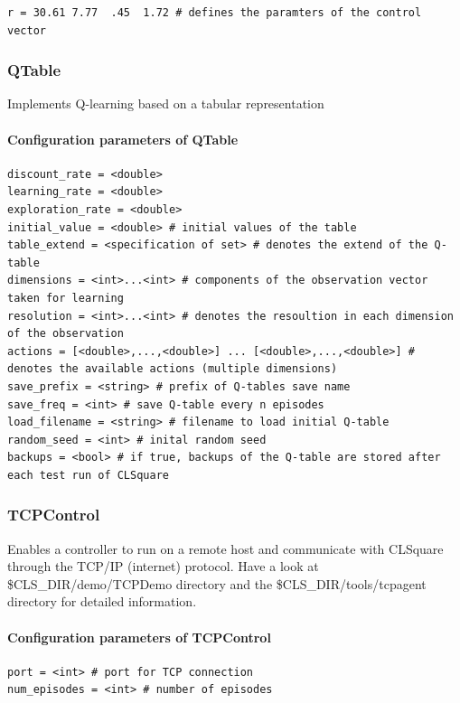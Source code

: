 \documentclass[a4paper,12pt,german]{article}
\newcommand{\clsdir}{{\$CLS\_DIR}}
\begin{document}
\begin{verbatim}
r = 30.61 7.77  .45  1.72 # defines the paramters of the control vector
\end{verbatim}

\subsubsection{QTable}

Implements Q-learning based on a tabular representation

\paragraph{Configuration parameters of QTable}

\begin{footnotesize}
\begin{verbatim}
discount_rate = <double>
learning_rate = <double>  
exploration_rate = <double> 
initial_value = <double> # initial values of the table
table_extend = <specification of set> # denotes the extend of the Q-table
dimensions = <int>...<int> # components of the observation vector taken for learning
resolution = <int>...<int> # denotes the resoultion in each dimension of the observation 
actions = [<double>,...,<double>] ... [<double>,...,<double>] # denotes the available actions (multiple dimensions)
save_prefix = <string> # prefix of Q-tables save name
save_freq = <int> # save Q-table every n episodes
load_filename = <string> # filename to load initial Q-table 
random_seed = <int> # inital random seed
backups = <bool> # if true, backups of the Q-table are stored after each test run of CLSquare
\end{verbatim}
\end{footnotesize}

\subsubsection{TCPControl}
Enables a controller to run on a remote host and communicate with CLSquare through
the TCP/IP (internet) protocol. Have a look at \clsdir/demo/TCPDemo directory 
and the \clsdir/tools/tcpagent directory for detailed information.

\paragraph{Configuration parameters of TCPControl}

\begin{footnotesize}
\begin{verbatim}
port = <int> # port for TCP connection
num_episodes = <int> # number of episodes 
\end{verbatim}
\end{footnotesize}
\end{document}
